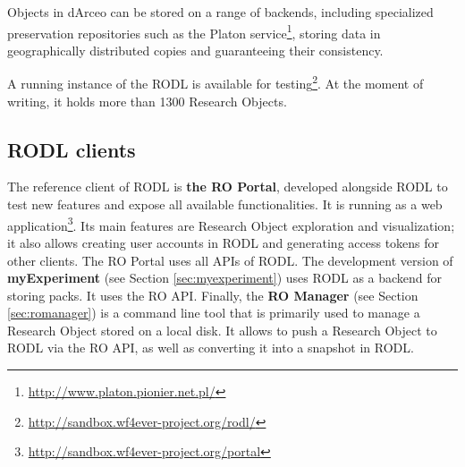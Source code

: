 Objects in dArceo can be stored on a range of backends, including specialized preservation repositories such as the Platon service\footnote{\url{http://www.platon.pionier.net.pl/}}, storing data in geographically distributed copies and guaranteeing their consistency.

A running instance of the RODL is available for testing\footnote{\url{http://sandbox.wf4ever-project.org/rodl/}}. At the moment of writing, it holds more than 1300 Research Objects.







\subsection{RODL clients}


The reference client of RODL is \textbf{the RO Portal}, developed alongside RODL to test new features and expose all available functionalities. It is running as a web application\footnote{\url{http://sandbox.wf4ever-project.org/portal}}. Its main features are Research Object exploration and visualization; it also allows creating user accounts in RODL and generating access tokens for other clients. The RO Portal uses all APIs of RODL. %
The development version of \textbf{myExperiment} (see Section \ref{sec:myexperiment}) %
 uses RODL as a backend for storing packs. It uses the RO API. Finally, the \textbf{RO Manager} (see Section \ref{sec:romanager}) %
is a command line tool that is primarily used to manage a Research Object stored on a local disk. It allows to push a Research Object to RODL via the RO API, as well as converting it into a snapshot in RODL.

